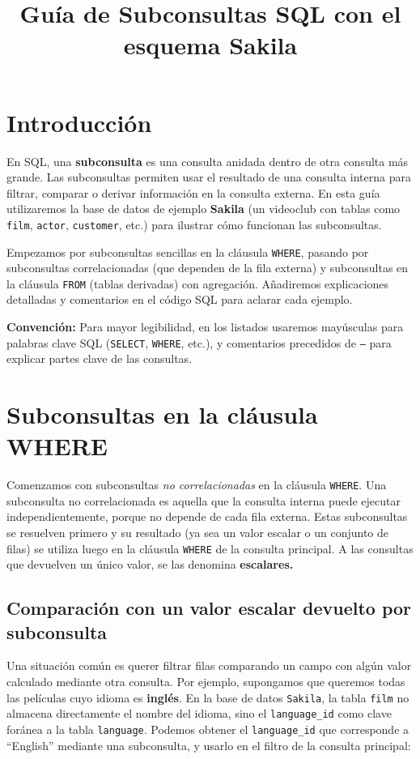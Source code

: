 \documentclass[12pt,a4paper]{article}
\title{\textbf{Guía de Subconsultas SQL con el esquema Sakila}}
\author{}
\date{}
\begin{document}
\maketitle 

\tableofcontents

\newpage
\section*{Introducción} 

En SQL, una \textbf{subconsulta} es una consulta anidada dentro de otra consulta más grande.
%
Las subconsultas permiten usar el resultado de una consulta interna para filtrar, comparar o derivar información en la consulta externa.
%
En esta guía utilizaremos la base de datos de ejemplo \textbf{Sakila} (un videoclub con tablas como \texttt{film}, \texttt{actor}, \texttt{customer}, etc.) para ilustrar cómo funcionan las subconsultas.

Empezamos por subconsultas sencillas en la cláusula \texttt{WHERE}, pasando por subconsultas correlacionadas (que dependen de la fila externa) y subconsultas en la cláusula \texttt{FROM} (tablas derivadas) con agregación.
Añadiremos explicaciones detalladas y comentarios en el código SQL para aclarar cada ejemplo.

\textbf{Convención:} Para mayor legibilidad, en los listados usaremos mayúsculas para palabras clave SQL (\texttt{SELECT}, \texttt{WHERE}, etc.), y comentarios precedidos de \texttt{--} para explicar partes clave de las consultas. 


\section{Subconsultas en la cláusula WHERE} 


Comenzamos con subconsultas \emph{no correlacionadas} en la cláusula \texttt{WHERE}.
%
Una subconsulta no correlacionada es aquella que la consulta interna puede ejecutar independientemente, porque no depende de cada fila externa.
%
Estas subconsultas se resuelven primero y su resultado (ya sea un valor escalar o un conjunto de filas) se utiliza luego en la cláusula \texttt{WHERE} de la consulta principal. 
%
A las consultas que devuelven un único valor, se las denomina \textbf{escalares.}



\subsection*{Comparación con un valor escalar devuelto por subconsulta} Una situación común es querer filtrar filas comparando un campo con algún valor calculado mediante otra consulta.
%
Por ejemplo, supongamos que queremos todas las películas cuyo idioma es \textbf{inglés}.
%
En la base de datos \texttt{Sakila}, la tabla \texttt{film} no almacena directamente el nombre del idioma, sino el \texttt{language\_id} como clave foránea a la tabla \texttt{language}.
%
Podemos obtener el \texttt{language\_id} que corresponde a “English” mediante una subconsulta, y usarlo en el filtro de la consulta principal: 
\end{document}
